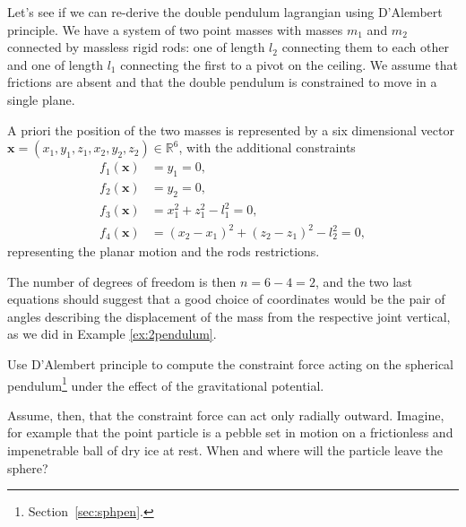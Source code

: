 \documentclass[english,fontsize=11pt,paper=a5,oneside]{scrbook}
\newcommand{\R}{\mathbb{R}}
\newcommand{\bx}{\bm{x}}
\theoremstyle{definition}
\newenvironment{example}
  {\pushQED{\qed}\renewcommand{\qedsymbol}{$\lozenge$}\examplex}
  {\popQED\endexamplex}
\newenvironment{exercise}
  {\pushQED{\qed}\renewcommand{\qedsymbol}{$\maltese$}\exercisex}
  {\popQED\endexercisex}
\begin{document}
\begin{example}[Double pendulum revisited]
  Let's see if we can re-derive the double pendulum lagrangian using D'Alembert principle.
  We have a system of two point masses with masses $m_1$ and $m_2$ connected by massless rigid rods: one of length $l_2$ connecting them to each other and one of length $l_1$ connecting the first to a pivot on the ceiling. We assume that frictions are absent and that the double pendulum is constrained to move in a single plane.

  A priori the position of the two masses is represented by a six dimensional vector
  $\bx = (x_1, y_1, z_1, x_2, y_2, z_2)\in\R^6$, with the additional constraints
  \begin{align}
    f_1(\bx) & = y_1 = 0,                               \\
    f_2(\bx) & = y_2 = 0,                               \\
    f_3(\bx) & = x_1^2 + z_1^2 - l_1^2 = 0,             \\
    f_4(\bx) & = (x_2-x_1)^2 + (z_2-z_1)^2 - l_2^2 = 0,
  \end{align}
  representing the planar motion and the rods restrictions.

  The number of degrees of freedom is then $n = 6 -4 = 2$, and the two last equations should suggest that a good choice of coordinates would be the pair of angles describing the displacement of the mass from the respective joint vertical, as we did in Example \ref{ex:2pendulum}.
\end{example}

\begin{exercise}
  Use D'Alembert principle to compute the constraint force acting on the spherical pendulum\footnote{Section~\ref{sec:sphpen}.} under the effect of the gravitational potential.

  Assume, then, that the constraint force can act only radially outward. Imagine, for example that the point particle is a pebble set in motion on a frictionless and impenetrable ball of dry ice at rest.
  When and where will the particle leave the sphere?
\end{exercise}

\end{document}
